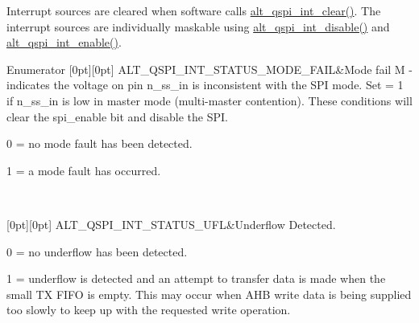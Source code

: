 Interrupt sources are cleared when software calls \mbox{\hyperlink{group__ALT__QSPI__CSR_gaf436f88abd8e2af796cc070792db5168}{alt\+\_\+qspi\+\_\+int\+\_\+clear()}}. The interrupt sources are individually maskable using \mbox{\hyperlink{group__ALT__QSPI__CSR_gabafd6da28abc48578f144cbd6c85e224}{alt\+\_\+qspi\+\_\+int\+\_\+disable()}} and \mbox{\hyperlink{group__ALT__QSPI__CSR_ga90573895220218be5c3be1888010e5bc}{alt\+\_\+qspi\+\_\+int\+\_\+enable()}}. \begin{DoxyEnumFields}{Enumerator}
[0pt][0pt]{}\mbox{\label{group__ALT__QSPI__CSR_gga919562dd181acc42914bea253e31fae1afc999a0148242b4b2ad01f5f22ecda5b}} 
A\+L\+T\+\_\+\+Q\+S\+P\+I\+\_\+\+I\+N\+T\+\_\+\+S\+T\+A\+T\+U\+S\+\_\+\+M\+O\+D\+E\+\_\+\+F\+A\+IL&Mode fail M -\/ indicates the voltage on pin n\+\_\+ss\+\_\+in is inconsistent with the S\+PI mode. Set = 1 if n\+\_\+ss\+\_\+in is low in master mode (multi-\/master contention). These conditions will clear the spi\+\_\+enable bit and disable the S\+PI.
\begin{DoxyItemize}
\item 0 = no mode fault has been detected.
\item 1 = a mode fault has occurred. 
\end{DoxyItemize}\\
\hline

[0pt][0pt]{}\mbox{\label{group__ALT__QSPI__CSR_gga919562dd181acc42914bea253e31fae1aaf4c937a561295b3f46821b3a4daf134}} 
A\+L\+T\+\_\+\+Q\+S\+P\+I\+\_\+\+I\+N\+T\+\_\+\+S\+T\+A\+T\+U\+S\+\_\+\+U\+FL&Underflow Detected.
\begin{DoxyItemize}
\item 0 = no underflow has been detected.
\item 1 = underflow is detected and an attempt to transfer data is made when the small TX F\+I\+FO is empty. This may occur when A\+HB write data is being supplied too slowly to keep up with the requested write operation. 
\end{DoxyItemize}\\
\hline


\end{DoxyEnumFields}
